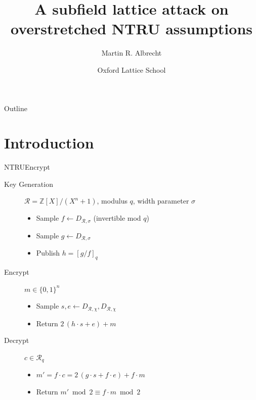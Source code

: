 \documentclass[presentation,smaller]{beamer}
\author{Martin R. Albrecht}
\date{Oxford Lattice School}
\title{A subfield lattice attack on overstretched NTRU assumptions}
\newcommand{\cR}{\ensuremath{\mathcal{R}}\xspace}
\newcommand{\Z}{\ensuremath{\mathbb Z}\xspace}
\begin{document}
\maketitle
\begin{frame}{Outline}
\tableofcontents
\end{frame}


\begin{frame}[label={sec:org3f0a771}]{}
\end{frame}

\section{Introduction}
\label{sec:orgf49d53c}
\begin{frame}[label={sec:org0e5ad1a}]{NTRUEncrypt}
\begin{description}
\item[{Key Generation}] \(\cR = \Z[X]/(X^n+1)\), modulus \(q\), width parameter \(σ\)
\begin{itemize}
\item Sample \(f \gets D_{\cR, σ}\) (invertible mod \(q\))
\item Sample \(g \gets D_{\cR, σ}\)
\item Publish \(h = {[g/f]}_q\)
\end{itemize}

\item[{Encrypt}] \(m ∈ \{0,1\}^n\)
\begin{itemize}
\item Sample \(s,e \gets D_{\cR,χ}, D_{\cR,χ}\)
\item Return \(2\, (h ⋅ s + e) + m\)
\end{itemize}

\item[{Decrypt}] \(c ∈ \cR_q\)
\begin{itemize}
\item \(m' = f ⋅ c = 2\, (g ⋅ s + f ⋅ e) + f ⋅ m\)
\item Return  \(m' \bmod 2 ≡ f ⋅ m \bmod 2\)
\end{itemize}
\end{description}

\end{frame}
\end{document}
